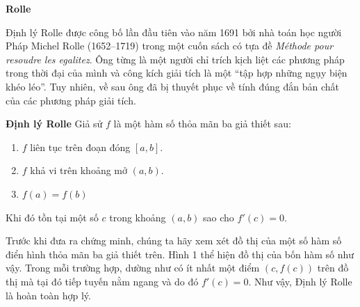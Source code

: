 \noindent
\begin{minipage}[t]{48mm}
  \vspace{0pt}
  \begin{tcolorbox}[
    enhanced,
    colback=white,
    colframe=rolleboxgreen,
    boxrule=0.7pt,
    arc=2pt,
    left=5pt, right=5pt, top=5pt, bottom=5pt
  ]
    {\sffamily\bfseries\color{rolleboxgreen} Rolle}\par\vspace{3pt}
    {\fontsize{8}{10.5}\selectfont
    Định lý Rolle được công bố lần đầu tiên vào năm 1691 bởi nhà toán học người Pháp Michel Rolle (1652--1719) trong một cuốn sách có tựa đề \textit{Méthode pour resoudre les egalitez}. Ông từng là một người chỉ trích kịch liệt các phương pháp trong thời đại của mình và công kích giải tích là một “tập hợp những ngụy biện khéo léo”. Tuy nhiên, về sau ông đã bị thuyết phục về tính đúng đắn bản chất của các phương pháp giải tích.\par}
  \end{tcolorbox}
\end{minipage}%
\hspace{7mm}%
\begin{minipage}[t]{125mm}
  \vspace{0pt}
  \begin{tcolorbox}[
    enhanced,
    colback=white,
    colframe=theoremred,
    boxrule=0.8pt,
    arc=0pt,
    left=9pt, right=9pt, top=7pt, bottom=7pt
  ]
    {\sffamily\bfseries\color{theoremred} Định lý Rolle}\quad
    {\fontsize{9.5}{13.5}\selectfont Giả sử $f$ là một hàm số thỏa mãn ba giả thiết sau:}
    \begin{enumerate}[label=\textbf{\arabic*.}, leftmargin=18pt, itemsep=2pt, topsep=3pt, parsep=0pt]
      \item $f$ liên tục trên đoạn đóng $[a, b]$.
      \item $f$ khả vi trên khoảng mở $(a, b)$.
      \item $f(a) = f(b)$
    \end{enumerate}
    \vspace{2pt}
    {\fontsize{9.5}{13.5}\selectfont Khi đó tồn tại một số $c$ trong khoảng $(a, b)$ sao cho $f'(c) = 0$.}
  \end{tcolorbox}

  \vspace{6pt}
  {\fontsize{9.5}{13.5}\selectfont
  Trước khi đưa ra chứng minh, chúng ta hãy xem xét đồ thị của một số hàm số điển hình thỏa mãn ba giả thiết trên. Hình 1 thể hiện đồ thị của bốn hàm số như vậy. Trong mỗi trường hợp, dường như có ít nhất một điểm $(c, f(c))$ trên đồ thị mà tại đó tiếp tuyến nằm ngang và do đó $f'(c) = 0$. Như vậy, Định lý Rolle là hoàn toàn hợp lý.
  }
\end{minipage}

